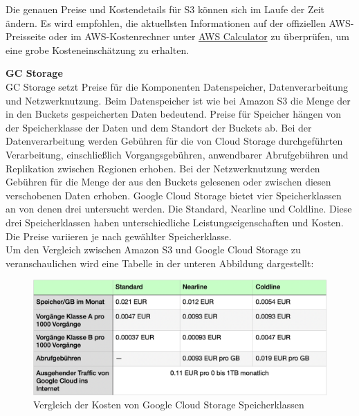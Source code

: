 Die genauen Preise und Kostendetails für S3 können sich im Laufe der Zeit ändern. Es wird empfohlen, die aktuellsten Informationen auf der offiziellen AWS-Preisseite oder im AWS-Kostenrechner unter \href{https://calculator.aws/}{AWS Calculator} zu überprüfen, um eine grobe Kosteneinschätzung zu erhalten.

\newpage

\textbf{GC Storage}\\

GC Storage setzt Preise für die Komponenten Datenspeicher, Datenverarbeitung und Netzwerknutzung. Beim Datenspeicher ist wie bei Amazon S3 die Menge der in den Buckets gespeicherten Daten bedeutend. Preise für Speicher hängen von der Speicherklasse der Daten und dem Standort der Buckets ab. Bei der Datenverarbeitung werden Gebühren für die von Cloud Storage durchgeführten Verarbeitung, einschließlich Vorgangsgebühren, anwendbarer Abrufgebühren und Replikation zwischen Regionen erhoben. Bei der Netzwerknutzung werden Gebühren für die Menge der aus den Buckets gelesenen oder zwischen diesen verschobenen Daten erhoben. Google Cloud Storage bietet vier Speicherklassen an von denen drei untersucht werden. Die Standard, Nearline und Coldline. Diese drei Speicherklassen haben unterschiedliche Leistungseigenschaften und Kosten. Die Preise variieren je nach gewählter Speicherklasse.\\

Um den Vergleich zwischen Amazon S3 und Google Cloud Storage zu veranschaulichen wird eine Tabelle in der unteren Abbildung dargestellt:

\begin{figure}[h]
	\centering
	\includegraphics[width=12cm,keepaspectratio]{Pictures/GCStorageClassKosten.png}
	\caption{Vergleich der Kosten von Google Cloud Storage Speicherklassen}
\end{figure}

